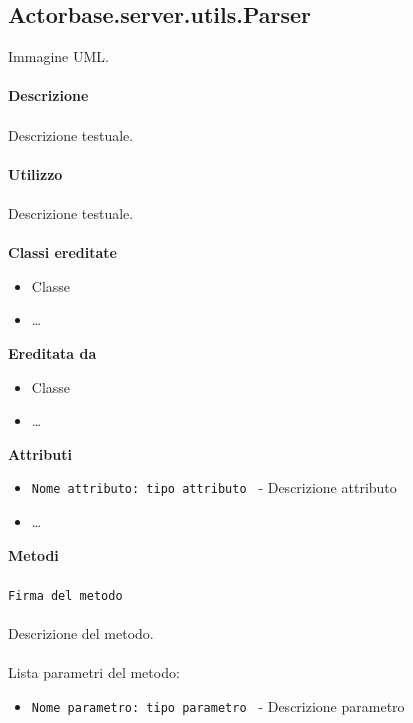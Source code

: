 \documentclass[a4paper]{article}
\begin{document}
	\subsection{Actorbase.server.utils.Parser}
		Immagine UML.
		\\ \\
		\textbf{Descrizione}
			\\ \\
			Descrizione testuale.
			\\ \\
		\textbf{Utilizzo}
			\\ \\
			Descrizione testuale.
			\\ \\
		\textbf{Classi ereditate}
			\begin{itemize}
				\item Classe
				\item \dots
			\end{itemize}
		\textbf{Ereditata da}
			\begin{itemize}
				\item Classe
				\item \dots
			\end{itemize}
		\textbf{Attributi}
			\begin{itemize}
				\item \texttt{Nome attributo: tipo attributo } - Descrizione attributo
				\item \dots
			\end{itemize}
		\textbf{Metodi}
			\\ \\
			\texttt{Firma del metodo}
			\\ \\
			Descrizione del metodo.
			\\ \\
			Lista parametri del metodo:
			\begin{itemize}
				\item \texttt{Nome parametro: tipo parametro } - Descrizione parametro
			\end{itemize}
			
\end{document}
